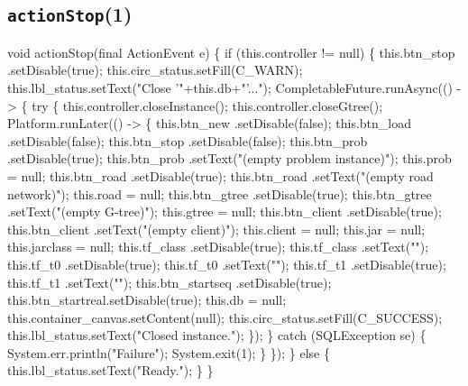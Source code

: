\subsection{\texttt{actionStop}(1)}
\nwenddocs{}\endmoddef{}
void actionStop(final ActionEvent e) \{
  if (this.controller != null) \{
    this.btn_stop     .setDisable(true);
    this.circ_status.setFill(C_WARN);
    this.lbl_status.setText("Close '"+this.db+"'...");
    CompletableFuture.runAsync(() -> \{
      try \{
        this.controller.closeInstance();
        this.controller.closeGtree();
        Platform.runLater(() -> \{
          this.btn_new      .setDisable(false);
          this.btn_load     .setDisable(false);
          this.btn_stop     .setDisable(false);
          this.btn_prob     .setDisable(true);
          this.btn_prob     .setText("(empty problem instance)");
          this.prob = null;
          this.btn_road     .setDisable(true);
          this.btn_road     .setText("(empty road network)");
          this.road = null;
          this.btn_gtree    .setDisable(true);
          this.btn_gtree    .setText("(empty G-tree)");
          this.gtree = null;
          this.btn_client   .setDisable(true);
          this.btn_client   .setText("(empty client)");
          this.client = null;
          this.jar = null;
          this.jarclass = null;
          this.tf_class     .setDisable(true);
          this.tf_class     .setText("");
          this.tf_t0        .setDisable(true);
          this.tf_t0        .setText("");
          this.tf_t1        .setDisable(true);
          this.tf_t1        .setText("");
          this.btn_startseq .setDisable(true);
          this.btn_startreal.setDisable(true);
          this.db = null;
          this.container_canvas.setContent(null);
          this.circ_status.setFill(C_SUCCESS);
          this.lbl_status.setText("Closed instance.");
        \});
      \} catch (SQLException se) \{
        System.err.println("Failure");
        System.exit(1);
      \}
    \});
  \} else \{
    this.lbl_status.setText("Ready.");
  \}
\}
\eatline
{}\nwendcode{}\nwdocspar
